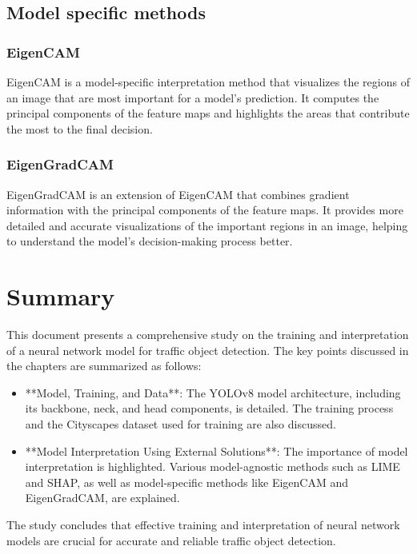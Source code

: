 \documentclass[11pt,a4paper,oneside]{report}
\begin{document}
\section{Model specific methods}\label{sec:model-specific-methods}

\subsection{EigenCAM}\label{subsec:eigencam}
EigenCAM is a model-specific interpretation method that visualizes the regions of an image that are most
important for a model's prediction.
It computes the principal components of the feature maps and highlights the areas that contribute the most
to the final decision.
\subsection{EigenGradCAM}\label{subsec:eigengradcam}
EigenGradCAM is an extension of EigenCAM that combines gradient information with the principal components
of the feature maps.
It provides more detailed and accurate visualizations of the important regions in an image,
helping to understand the model's decision-making process better.

\chapter*{Summary}

This document presents a comprehensive study on the training and interpretation of a neural network
model for traffic object detection.
The key points discussed in the chapters are summarized as follows:

\begin{itemize}
    \item **Model, Training, and Data**: The YOLOv8 model architecture, including its backbone, neck, and head components, is detailed. The training process and the Cityscapes dataset used for training are also discussed.
    \item **Model Interpretation Using External Solutions**: The importance of model interpretation is highlighted. Various model-agnostic methods such as LIME and SHAP, as well as model-specific methods like EigenCAM and EigenGradCAM, are explained.
\end{itemize}

The study concludes that effective training and interpretation of neural network models are crucial for accurate and reliable traffic object detection.
\end{document}
